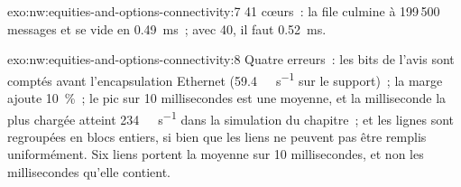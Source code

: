\begin{solution}{exo:nw:equities-and-options-connectivity:7}
41 cœurs~: la file culmine à 199\,500 messages et se vide en \qty{0.49}{\milli\second}~; avec 40, il faut \qty{0.52}{\milli\second}.
\end{solution}

\begin{solution}{exo:nw:equities-and-options-connectivity:8}
Quatre erreurs~: les bits de l'avis sont comptés avant l'encapsulation Ethernet (\qty{59.4}{\giga\bit\per\second} sur le support)~; la marge ajoute 10~\%~;
le pic sur 10 millisecondes est une moyenne, et la milliseconde la plus chargée atteint \qty{234}{\giga\bit\per\second} dans la simulation du chapitre~;
et les lignes sont regroupées en blocs entiers, si bien que les liens ne peuvent pas être remplis uniformément. Six liens portent la moyenne sur 10 millisecondes, et non les millisecondes qu'elle contient.
\end{solution}


